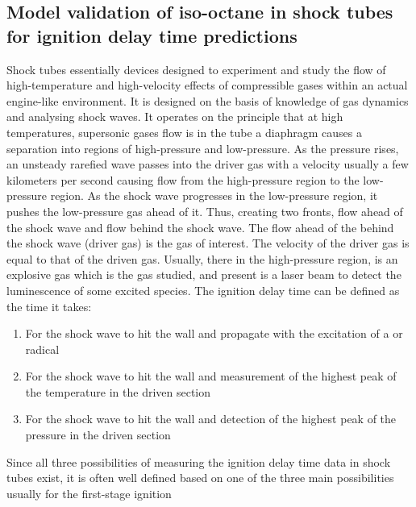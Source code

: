 \subsection{Model validation of iso-octane in shock tubes for ignition delay time predictions}
Shock tubes essentially devices designed to experiment and study the flow of high-temperature and high-velocity effects of compressible gases within an actual engine-like environment. It is designed on the basis of knowledge of gas dynamics and analysing shock waves. It operates on the principle that at high temperatures, supersonic gases flow is in the tube a diaphragm causes a separation into regions of high-pressure and low-pressure. As the pressure rises, an unsteady rarefied wave passes into the driver gas with a velocity usually a few kilometers per second causing flow from the high-pressure region to the low-pressure region. As the shock wave progresses in the low-pressure region, it pushes the low-pressure gas ahead of it. Thus, creating two fronts, flow ahead of the shock wave and flow behind the shock wave. The flow ahead of the behind the shock wave (driver gas) is the gas of interest. The velocity of the driver gas is equal to  that of the driven gas\cite{Greene1964TheR.}. Usually, there in the high-pressure region, is an explosive gas which is the gas studied, and present is a laser beam to detect the luminescence of some excited species. The ignition delay time can be defined as the time it takes:
\begin{enumerate}
    \item For the shock wave to hit the wall and propagate with the excitation of a  or radical
    \item For the shock wave to hit the wall and measurement of the highest peak of the temperature in the driven section
    \item For the shock wave to hit the wall and detection of the highest peak of the pressure in the driven section
\end{enumerate}
Since all three possibilities of measuring the ignition delay time data in shock tubes exist, it is often well defined based on one of the three main possibilities usually for the first-stage ignition \cite{Davidson2004InterpretingData}\cite{Fieweger1994Shock-tubePressures}\cite{Fieweger1997Self-ignitionPressure}\cite{Pfahl1996Self-ignitionConditions}\cite{Haylett2012IgnitionTube}

